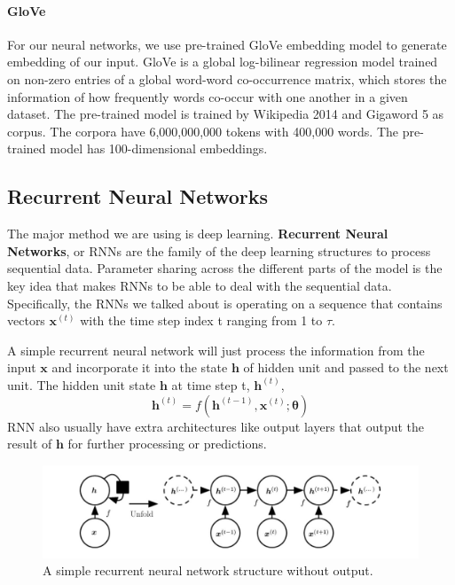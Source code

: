\documentclass[11pt]{article}
\begin{document}
\paragraph{GloVe} For our neural networks, we use pre-trained GloVe embedding model \cite{pennington2014glove} to generate embedding of our input. GloVe is a global log-bilinear regression model trained on non-zero entries of a global word-word co-occurrence matrix, which stores the information of how frequently words co-occur with one another in a given dataset. The pre-trained model is trained by Wikipedia 2014 and Gigaword 5 as corpus. The corpora have 6,000,000,000 tokens with 400,000 words. The pre-trained model has 100-dimensional embeddings.

\subsection{Recurrent Neural Networks}

The major method we are using is deep learning. \textbf{Recurrent Neural Networks}, or RNNs \cite{rumelhart1986} are the family of the deep learning structures to process sequential data. Parameter sharing across the different parts of the model is the key idea that makes RNNs to be able to deal with the sequential data. Specifically, the RNNs we talked about is operating on a sequence that contains vectors \(\bm{x}^{(t)}\) with the time step index t ranging from 1 to \(\tau\).

A simple recurrent neural network will just process the information from the input \(\bm{x}\) and incorporate it into the state \(\bm{h}\) of hidden unit and  passed to the next unit. The hidden unit state \(\bm{h}\) at time step t, \(\bm{h}^{(t)}\),
\[\bm{h}^{(t)} = f(\bm{h}^{(t-1)},\bm{x}^{(t)}; \bm{\theta} )\]
RNN also usually have extra architectures like output layers that output the result of \(\bm{h}\) for further processing or predictions.

\begin{figure}[htbp]
	\centering
	\includegraphics[width=0.9\linewidth]{SimpleRNN.jpg}
	\caption{A simple recurrent neural network structure without output.}
	\label{fig:rnn}
\end{figure}
\end{document}
